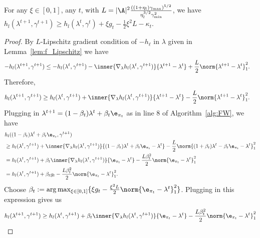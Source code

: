 \documentclass{article}
\newcommand{\lalit}[1]{\textcolor{blue}{}}
\newcommand{\1}{\mathbf{1}}
\begin{document}
\begin{lemma}\label{lem:recursive}
For any $\xi\in[0,1]$, any $t$, with $L=|\A|^2\frac{((1+\eta_l)\gamma_{\max})^{5/2}}{\eta_l^{3/2}\gamma_{\min}^2}$, we have $h_l(\lambda^{t+1},\gamma^{t+1})\geq h_l(\lambda^{t},\gamma^{t})+\xi g_t-\frac{1}{2}\xi^2L-\kappa_t$. 
\end{lemma}
\begin{proof}
By $L$-Lipschitz gradient condition of $-h_{\ell}$ in $\lambda$ given in Lemma~\ref{lem:f_Lipschitz} we have 
\begin{align*}
    -h_l(\lambda^{t+1},\gamma^{t+1})&\leq -h_l(\lambda^{t}, \gamma^{t+1}) - \inner{\nabla_{\lambda}h_l(\lambda^{t}, \gamma^{t+1})}{\lambda^{t+1}-\lambda^{t}}+\frac{L}{2}\norm{\lambda^{t+1}-\lambda^{t}}_1^2.
\end{align*}
Therefore, 
\begin{align*}
    h_l(\lambda^{t+1},\gamma^{t+1})&\geq
    h_l(\lambda^{t}, \gamma^{t+1}) + \inner{\nabla_{\lambda}h_l(\lambda^{t}, \gamma^{t+1})}{\lambda^{t+1}-\lambda^{t}}-\frac{L}{2}\norm{\lambda^{t+1}-\lambda^{t}}_1^2.
\end{align*}
Plugging in $\lambda^{t+1}=(1-\beta_t)\lambda^{t}+\beta_t\e_{\pi_t}$ as in line 8 of Algorithm~\ref{alg:FW}, we have 
\begin{align*}
    &h_l((1-\beta_t)\lambda^{t}+\beta_t\e_{\pi_t}, \gamma^{t+1})\\
    &\geq h_l(\lambda^{t},\gamma^{t+1}) +\inner{\nabla_{\lambda}h_l(\lambda^{t}, \gamma^{t+1})}{(1-\beta_t)\lambda^{t}+\beta_t\e_{\pi_t}-\lambda^{t}}-\frac{L}{2}\norm{(1+\beta_t)\lambda^{t}-\beta_t\e_{\pi_t}-\lambda^{t}}_1^2\\
    &=h_l(\lambda^{t},\gamma^{t+1})+\beta_t \inner{\nabla_{\lambda}h_l(\lambda^{t}, \gamma^{t+1})}{\e_{\pi_t}-\lambda^{t}}-\frac{L\beta_t^2}{2}\norm{\e_{\pi_t}-\lambda^{t}}_1^2\\
    &=h_l(\lambda^{t},\gamma^{t+1})+\beta_t g_t-\frac{L\beta_t^2}{2}\norm{\e_{\pi_t}-\lambda^{t}}_1^2.
\end{align*}
Choose $\beta_t:=\arg\max_{\xi\in[0,1]}\{\xi g_t-\frac{\xi^2 L}{2}\norm{\e_{\pi_t}-\lambda^{t}}_1^2\}$. Plugging in this expression gives us 
\begin{align*}
    h_l(\lambda^{t+1}, \gamma^{t+1})&\geq h_l(\lambda^{t},\gamma^{t+1}) +\beta_t \inner{\nabla_{\lambda}h_l(\lambda^{t}, \gamma^{t+1})}{\e_{\pi_t}-\lambda^{t}}-\frac{L\beta_t^2}{2}\norm{\e_{\pi_t}-\lambda^{t}}_1^2\\

\end{align*}
\end{proof}
\end{document}

